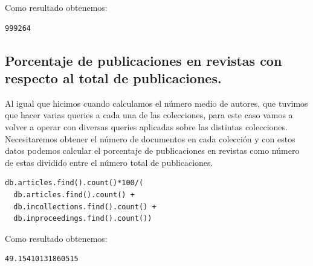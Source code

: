 Como resultado obtenemos:

\begin{verbatim}
999264
\end{verbatim}

\subsection{Porcentaje de publicaciones en revistas con respecto al total de publicaciones.}

Al igual que hicimos cuando calculamos el número medio de autores, que tuvimos que hacer varias queries a cada una de las colecciones, para este caso vamos a volver a operar con diversas queries aplicadas sobre las distintas colecciones. Necesitaremos obtener el número de documentos en cada colección y con estos datos podemos calcular el porcentaje de publicaciones en revistas como número de estas dividido entre el número total de publicaciones.

\begin{verbatim}
db.articles.find().count()*100/(
  db.articles.find().count() + 
  db.incollections.find().count() + 
  db.inproceedings.find().count())
\end{verbatim}


Como resultado obtenemos:

\begin{verbatim}
49.15410131860515
\end{verbatim}


